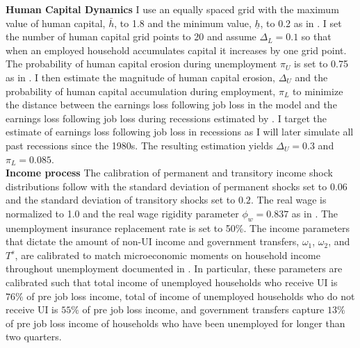\textbf{Human Capital Dynamics}  I use an equally spaced grid with the maximum value of human capital, $\bar{h}$, to 1.8 and the minimum value, $\underline{h}$, to 0.2 as in \cite{Birinci2021}. I set the number of human capital grid points to 20 and assume $\Delta_{L} = 0.1$ so that when an employed household accumulates capital it increases by one grid point. The probability of human capital erosion during unemployment $\pi_{U}$ is set to 0.75 as in \cite{Birinci2021}. I then estimate the magnitude of human capital erosion, $\Delta_{U}$ and the probability of human capital accumulation during employment, $\pi_{L}$ to minimize the distance between the earnings loss following job loss in the model and the earnings loss following job loss during recessions estimated by \cite{DavisVonWachter2011}. I target the estimate of earnings loss following job loss in recessions as I will later simulate all past recessions since the 1980s. The resulting estimation yields  $\Delta_{U} = 0.3$ and $\pi_{L}=0.085$. \\

\textbf{Income process}    The calibration of permanent and transitory income shock distributions follow \cite{carroll2017distribution} with the standard deviation of permanent shocks set to $0.06$ and the standard deviation of transitory shocks set to $0.2$. The real wage is normalized to 1.0 and the real wage rigidity parameter $\phi_{w} = 0.837$ as in \cite{Gornemann2021}. The unemployment insurance replacement rate is set to 50\%. The income parameters that dictate the amount of non-UI income and government transfers, $\omega_{1}$, $\omega_{2}$, and $T^{s}$, are calibrated to match microeconomic moments on household income throughout unemployment documented in \cite{kekre2023}. In particular, these parameters are calibrated such that total income of unemployed households who receive UI is $76\%$ of pre job loss income, total of income of unemployed households who do not receive UI is $55\%$ of pre job loss income, and government transfers capture $13\%$ of pre job loss income of households who have been unemployed for longer than two quarters. \\

